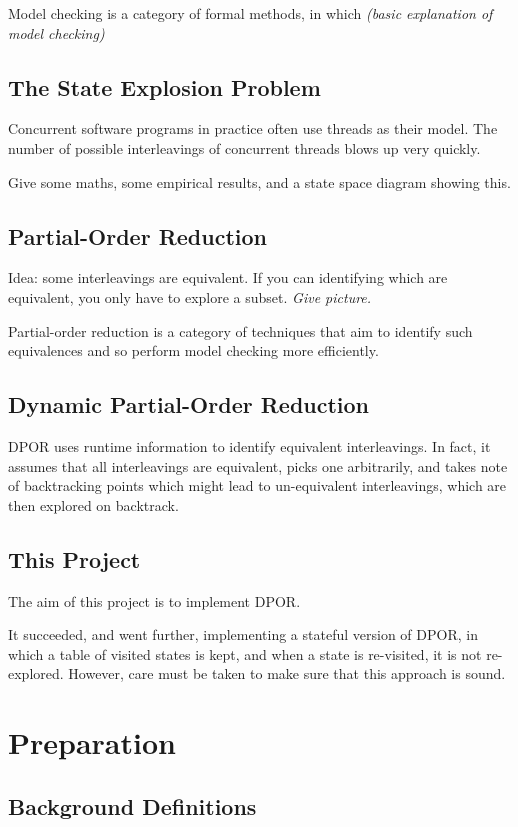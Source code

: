 \documentclass[12pt,a4paper,twoside,openright]{report}
\begin{document}
Model checking is a category of formal
methods, in which \emph{(basic explanation of
model checking)}

\section{The State Explosion Problem}
Concurrent software programs in practice often
use threads as their model. The number of possible
interleavings of concurrent threads blows up very 
quickly.

Give some maths, some empirical results,
and a state space diagram showing this.

\section{Partial-Order Reduction}
Idea: some interleavings are equivalent. If you
can identifying which are equivalent, you only
have to explore a subset. \emph{Give picture.}

Partial-order reduction is a category of techniques
that aim to identify such equivalences and so
perform model checking more efficiently.

\section{Dynamic Partial-Order Reduction}
DPOR uses runtime information to identify
equivalent interleavings. In fact, it assumes
that all interleavings are equivalent, picks
one arbitrarily, and takes note of backtracking
points which might lead to un-equivalent
interleavings, which are then explored on
backtrack.

\section{This Project}
The aim of this project is to implement DPOR.

It succeeded, and went further, implementing
a stateful version of DPOR, in which a table
of visited states is kept, and when a state is
re-visited, it is not re-explored. However, care
must be taken to make sure that this approach is
sound.

\chapter{Preparation}

\section{Background Definitions}
\end{document}
